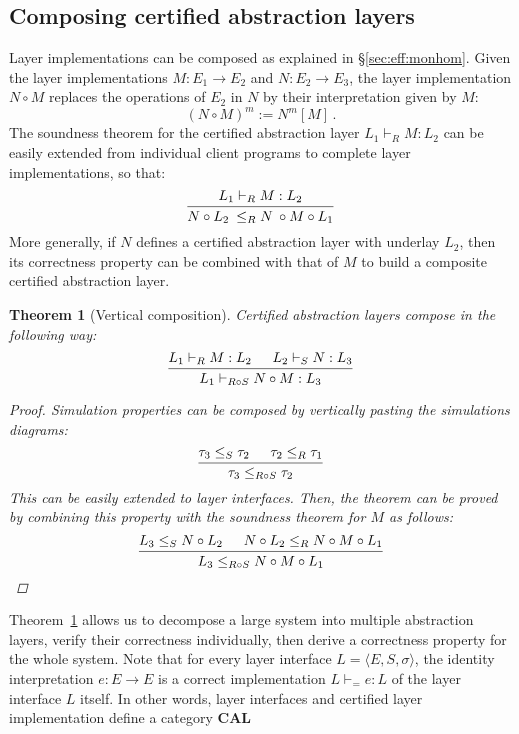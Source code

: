 \documentclass[11pt,oneside]{book}
\newtheorem{theorem}{Theorem}[chapter]
\theoremstyle{definition}
\begin{document}

\subsection{Composing certified abstraction layers} %

Layer implementations can be composed
as explained in \S\ref{sec:eff:monhom}.
Given the layer implementations
$M : E_1 \rightarrow E_2$ and $N : E_2 \rightarrow E_3$,
the layer implementation $N \circ M$
replaces the operations of $E_2$ in $N$
by their interpretation given by $M$:
\[
  (N \circ M)^m := N^m[M]
  \,.
\]
The soundness theorem for the certified abstraction layer
$L_1 \vdash_R M : L_2$
can be easily extended from individual client programs
to complete layer implementations,
so that:
\[
  \begin{prooftree}
    \hypo{L_1 \vdash_R M : L_2}
    \infer1{N \circ L_2 \: \le_R N \: \circ M \circ L_1}
  \end{prooftree}
\]
More generally,
if $N$ defines a certified abstraction layer
with underlay $L_2$,
then its correctness property can be combined with that of $M$
to build a composite certified abstraction layer.

\begin{theorem}[Vertical composition] \label{thm:vcomp} %
Certified abstraction layers compose in the following way:
\[
  \begin{prooftree}
    \hypo{L_1 \vdash_R M : L_2}
    \hypo{L_2 \vdash_S N : L_3}
    \infer2{L_1 \vdash_{R \circ S} N \circ M : L_3}
  \end{prooftree}
\]
\begin{proof}
Simulation properties can be composed
by vertically pasting the simulations diagrams:
\[
  \begin{prooftree}
    \hypo{\tau_3 \le_S \tau_2}
    \hypo{\tau_2 \le_R \tau_1}
    \infer2{\tau_3 \le_{R \circ S} \tau_2}
  \end{prooftree}
\]
This can be easily extended to layer interfaces.
Then,
the theorem can be proved by
combining this property with the soundness theorem for $M$
as follows:
\[
  \begin{prooftree}
    \hypo{L_3 \le_S N \circ L_2}
    \hypo{N \circ L_2 \le_R N \circ M \circ L_1}
    \infer2{L_3 \le_{R \circ S} N \circ M \circ L_1}
  \end{prooftree}
\]
\end{proof}
\end{theorem}

Theorem~\ref{thm:vcomp} allows us to decompose a large system
into multiple abstraction layers,
verify their correctness individually,
then derive a correctness property for the whole system.
Note that for every layer interface
$L = \langle E, S, \sigma \rangle$,
the identity interpretation $e : E \rightarrow E$
is a correct implementation $L \vdash_{=} e : L$
of the layer interface $L$ itself.
In other words,
layer interfaces and certified layer implementation
define a category $\mathbf{CAL}$
\end{document}
